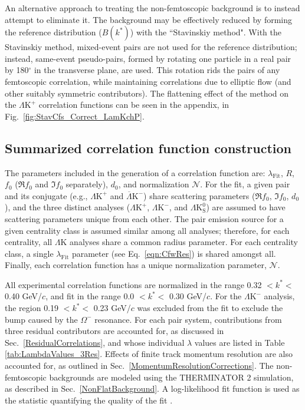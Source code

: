 \documentclass[ALICE,manyauthors]{cernphprep}
\newcommand{\LamK}{$\Lambda$K\xspace}
\newcommand{\LamKchP}{$\Lambda\mathrm{K^{+}}$\xspace}
\newcommand{\ALamKchM}{$\overline{\Lambda}\mathrm{K^{-}}$\xspace}
\newcommand{\LamKchM}{$\Lambda\mathrm{K^{-}}$\xspace}
\newcommand{\LamKs}{$\Lambda\mathrm{K^{0}_{S}}$\xspace}
\begin{document}
An alternative approach to treating the non-femtoscopic background is to instead attempt to eliminate it.
The background may be effectively reduced by forming the reference distribution ($B(k^{*})$) with the ``Stavinskiy method".
With the Stavinskiy method, mixed-event pairs are not used for the reference distribution; instead, same-event pseudo-pairs, formed by rotating one particle in a real pair by 180$^\circ$ in the transverse plane, are used.  
This rotation rids the pairs of any femtoscopic correlation, while maintaining correlations due to elliptic flow (and other suitably symmetric contributors).
The flattening effect of the method on the \LamKchP correlation functions can be seen in the appendix, in Fig.\ \ref{fig:StavCfs_Correct_LamKchP}.

\subsection{Summarized correlation function construction}
\label{SummarizedFitProcedure}

The parameters included in the generation of a correlation function are: $\lambda_{\mathrm{Fit}}$, $R$, $f_{0}$ ($\Re f_{0}$ and $\Im f_{0}$ separately), $d_{0}$, and normalization $\mathcal{N}$.
For the fit, a given pair and its conjugate (e.g., \LamKchP and \ALamKchM) share scattering parameters ($\Re f_{0}$, $\Im f_{0}$, $d_{0}$), and the three distinct analyses (\LamKchP, \LamKchM, and \LamKs) are assumed to have scattering parameters unique from each other.
The pair emission source for a given centrality class is assumed similar among all analyses; therefore, for each centrality, all \LamK analyses share a common radius parameter.
For each centrality class, a single $\lambda_{\mathrm{Fit}}$ parameter (see Eq.\ \ref{eqn:CfwRes}) is shared amongst all.
Finally, each correlation function has a unique normalization parameter, $\mathcal{N}$.

All experimental correlation functions are normalized in the range 0.32 $< k^{*} <$ 0.40 GeV/$c$, and fit in the range 0.0 $< k^{*} <$ 0.30 GeV/$c$.
For the \LamKchM analysis, the region 0.19 $< k^{*} <$ 0.23 GeV/$c$ was excluded from the fit to exclude the bump caused by the $\Omega^{-}$ resonance.
For each pair system, contributions from three residual contributors are accounted for, as discussed in Sec.\ \ref{ResidualCorrelations}, and whose individual $\lambda$ values are listed in Table \ref{tab:LambdaValues_3Res}.
Effects of finite track momentum resolution are also accounted for, as outlined in Sec.\ \ref{MomentumResolutionCorrections}.
The non-femtoscopic backgrounds are modeled using the THERMINATOR 2 simulation, as described in Sec.\ \ref{NonFlatBackground}.
A log-likelihood fit function is used as the statistic quantifying the quality of the fit \cite{Lisa:2005dd}.
\end{document}
